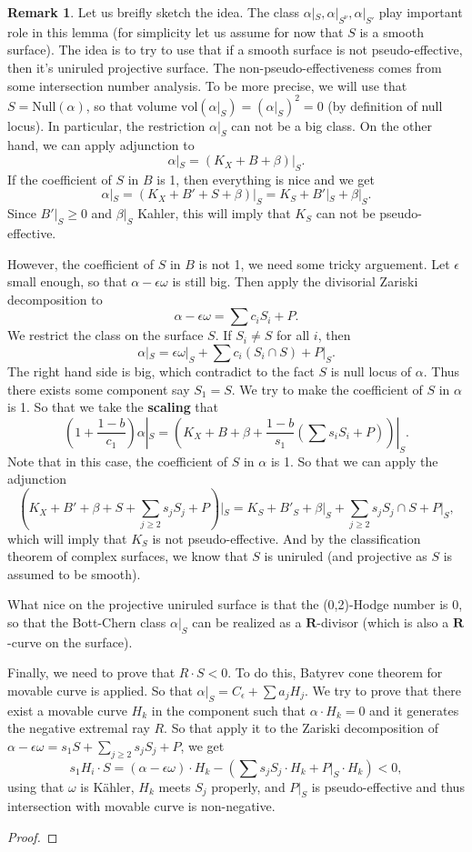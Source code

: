 \documentclass[11pt]{article}
\theoremstyle{definition}
\newtheorem{remark}[theorem]{Remark}
\begin{document}
	\begin{remark}
		Let us breifly sketch the idea. The class $\alpha|_S, \alpha|_{S^\nu}, \alpha|_{S'}$ play important role in this lemma (for simplicity let us assume for now that $S$ is a smooth surface). The idea is to try to use that if a smooth surface is not pseudo-effective, then it's uniruled projective surface. The non-pseudo-effectiveness comes from some intersection number analysis. To be more precise, we will use that $S = \text{Null}(\alpha)$, so that volume $\text{vol}(\alpha|_S)  = (\alpha|_S)^2= 0$ (by definition of null locus). In particular, the restriction $\alpha|_S$ can not be a big class. On the other hand, we can apply adjunction to $$\alpha|_S  = (K_X+B+\beta)|_S.$$
		If the coefficient of $S$ in $B$ is 1, then everything is nice and we get $$\alpha|_S = (K_X+B ' + S + \beta)|_S = K_S+ B'|_S + \beta|_S.$$Since $B'|_S\ge 0$ and $\beta|_S$ Kahler, this will imply that $K_S$ can not be pseudo-effective. 
		
		However, the coefficient of $S$ in $B$ is not 1, we need some tricky arguement. Let $\epsilon$ small enough, so that $\alpha - \epsilon \omega$ is still big. Then apply the divisorial Zariski decomposition to $$\alpha - \epsilon \omega  =  \sum c_i S_i + P.$$
		We restrict the class on the surface $S$. If $S_i \ne S$ for all $i$, then $$\alpha|_S = \epsilon \omega|_S + \sum c_i (S_i \cap S) + P|_S.$$The right hand side is big, which contradict to the fact $S$ is null locus of $\alpha$. Thus there exists some component say $S_1 = S$. We try to make the coefficient of $S$ in $\alpha$ is 1. So that we take the \textbf{scaling} that $$(1 + \frac{1-b}{c_1})\alpha|_S= (K_X+B +\beta + \frac{1-b}{s_1}(\sum s_i S_i+ P))|_S.$$
		Note that in this case, the coefficient of $S$ in $\alpha$ is 1. So that we can apply the adjunction $$(K_X+B' + \beta + S + \sum_{j\ge 2} s_j S_j + P)|_S = K_S+B'_S + \beta|_S + \sum_{j \ge 2} s_jS_j \cap S+ P|_S,$$which will imply that $K_S$ is not pseudo-effective. And by the classification theorem of complex surfaces, we know that $S$ is uniruled (and projective as $S$ is assumed to be smooth). 
		
		What nice on the projective uniruled surface is that the (0,2)-Hodge number is 0, so that the Bott-Chern class $\alpha|_S$ can be realized as a $\mathbf{R}$-divisor (which is also a $\mathbf{R}$-curve on the surface). 
		
		Finally, we need to prove that $R\cdot S<0$. To do this, Batyrev cone theorem for movable curve is applied. So that $\alpha|_S =  C_{\epsilon}+ \sum a_j H_j$. We try to prove that there exist a movable curve $H_k$ in the component such that $\alpha \cdot H_k = 0$ and it generates the negative extremal ray $R$. So that apply it to the Zariski decomposition of $\alpha -\epsilon \omega = s_1 S + \sum_{j\ge 2} s_j S_j + P $, we get $$s_1H_i \cdot S = (\alpha -\epsilon \omega)\cdot H_k - (\sum s_j S_j \cdot H_k + P|_S \cdot H_k)<0,$$ using that $\omega$ is K\"ahler, $H_k$ meets $S_j$ properly, and $P|_S$ is pseudo-effective and thus intersection with movable curve is non-negative. 
	\end{remark}
	\begin{proof}
		
	\end{proof}
	
\end{document}
